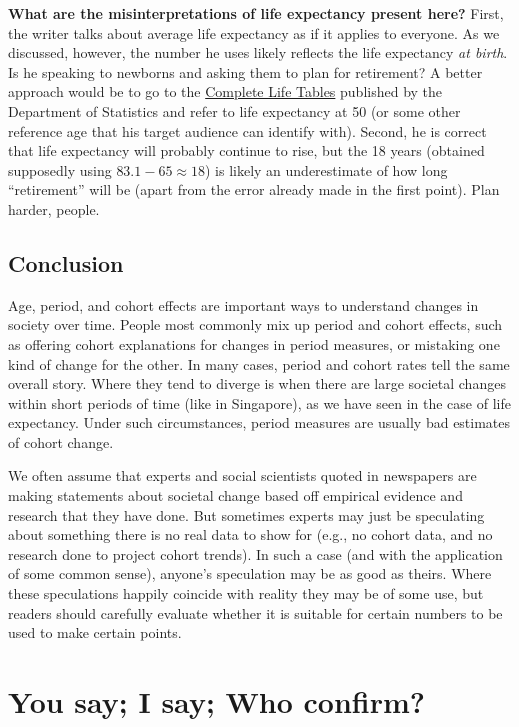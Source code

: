 \documentclass[openany]{book}
\begin{document}
\textbf{What are the misinterpretations of life expectancy present
here?} First, the writer talks about average life expectancy as if it
applies to everyone. As we discussed, however, the number he uses likely
reflects the life expectancy \emph{at birth}. Is he speaking to newborns
and asking them to plan for retirement? A better approach would be to go
to the
\href{https://www.singstat.gov.sg/-/media/files/publications/population/lifetable17-18.pdf}{Complete
Life Tables} published by the Department of Statistics and refer to life
expectancy at 50 (or some other reference age that his target audience
can identify with). Second, he is correct that life expectancy will
probably continue to rise, but the 18 years (obtained supposedly using
\(83.1 - 65 \approx 18\)) is likely an underestimate of how long
``retirement'' will be (apart from the error already made in the first
point). Plan harder, people.

\section{Conclusion}\label{conclusion-3}

Age, period, and cohort effects are important ways to understand changes
in society over time. People most commonly mix up period and cohort
effects, such as offering cohort explanations for changes in period
measures, or mistaking one kind of change for the other. In many cases,
period and cohort rates tell the same overall story. Where they tend to
diverge is when there are large societal changes within short periods of
time (like in Singapore), as we have seen in the case of life
expectancy. Under such circumstances, period measures are usually bad
estimates of cohort change.

We often assume that experts and social scientists quoted in newspapers
are making statements about societal change based off empirical evidence
and research that they have done. But sometimes experts may just be
speculating about something there is no real data to show for (e.g., no
cohort data, and no research done to project cohort trends). In such a
case (and with the application of some common sense), anyone's
speculation may be as good as theirs. Where these speculations happily
coincide with reality they may be of some use, but readers should
carefully evaluate whether it is suitable for certain numbers to be used
to make certain points.

\chapter{You say; I say; Who confirm?}\label{yousayisay}
\end{document}
